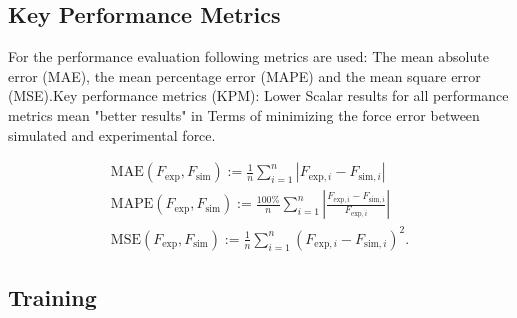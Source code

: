 \subsection{Key Performance Metrics}
For the performance evaluation following metrics are used: The mean absolute error (MAE), the mean percentage error (MAPE) and the mean square error (MSE).Key performance metrics (KPM):
Lower Scalar results for all performance metrics mean "better results" in Terms of minimizing the force error between simulated and experimental force.

\begin{align*}
\text{MAE}(F_{\text{exp}}, F_{\text{sim}}) := \frac{1}{n} \sum_{i=1}^{n} |F_{\text{exp},i} - F_{\text{sim},i}|
\\
\text{MAPE}(F_{\text{exp}}, F_{\text{sim}}) := \frac{100\%}{n} \sum_{i=1}^{n} \left| \frac{F_{\text{exp},i} - F_{\text{sim},i}}{F_{\text{exp},i}} \right|
\\
\text{MSE}(F_{\text{exp}}, F_{\text{sim}}) := \frac{1}{n} \sum_{i=1}^{n} \left(F_{\text{exp},i} - F_{\text{sim},i}\right)^2.
\end{align*}



\subsection{Training}



